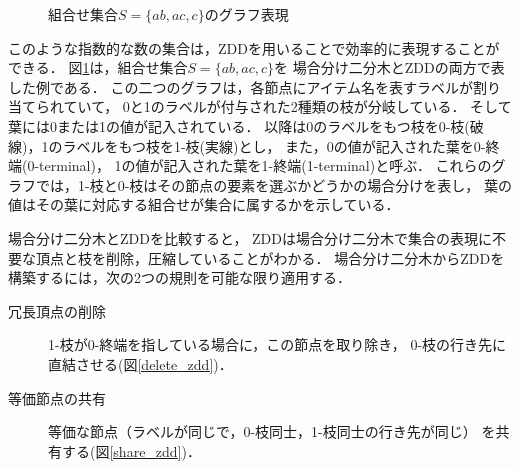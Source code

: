 \begin{figure}[htbp]
\begin{minipage}[b]{0.48\hsize}
    \label{zdd_graph}
  \end{minipage}
  \caption{組合せ集合$S=\{ab,ac,c\}$のグラフ表現}\label{combined_set}
\end{figure}

このような指数的な数の集合は，ZDDを用いることで効率的に表現することができる．
図\ref{combined_set}は，組合せ集合$S=\{ab,ac,c\}$を
場合分け二分木とZDDの両方で表した例である．
この二つのグラフは，各節点にアイテム名を表すラベルが割り当てられていて，
0と1のラベルが付与された2種類の枝が分岐している．
そして葉には0または1の値が記入されている．
以降は0のラベルをもつ枝を0-枝(破線)，1のラベルをもつ枝を1-枝(実線)とし，
また，0の値が記入された葉を0-終端(0-terminal)，
1の値が記入された葉を1-終端(1-terminal)と呼ぶ．
これらのグラフでは，1-枝と0-枝はその節点の要素を選ぶかどうかの場合分けを表し，
葉の値はその葉に対応する組合せが集合に属するかを示している．

場合分け二分木とZDDを比較すると，
ZDDは場合分け二分木で集合の表現に不要な頂点と枝を削除，圧縮していることがわかる．
場合分け二分木からZDDを構築するには，次の2つの規則を可能な限り適用する．

\begin{description}
  \item[冗長頂点の削除] 1-枝が0-終端を指している場合に，この節点を取り除き，
  0-枝の行き先に直結させる(図\ref{delete_zdd})．
  \item[等価節点の共有] 等価な節点（ラベルが同じで，0-枝同士，1-枝同士の行き先が同じ）
  を共有する(図\ref{share_zdd})．
\end{description}

